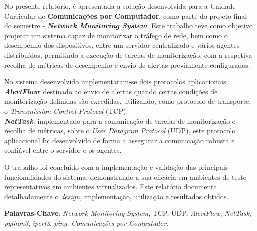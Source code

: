 \documentclass[a4paper,12pt]{scrreprt}
\begin{document}




\makecover





\renewenvironment{abstract}
 {\par\noindent\textbf{\Large\abstractname}\par\bigskip}
 {}

\begin{flushleft}
\begin{abstract}
    \par No presente relatório, é apresentada a solução desenvolvida para a Unidade Curricular
    de \textbf{Comunicações por Computador}, como parte do projeto final do semestre -
    \textbf{\textit{Network Monitoring System}}.
    Este trabalho teve como objetivo projetar um sistema capaz de monitorizar
    o tráfego de rede, bem como o desempenho dos dispositivos, entre um servidor
    centralizado e vários agentes distribuídos, permitindo a execução de tarefas
    de monitorização, com a respetiva recolha de métricas de desempenho e envio
    de alertas previamente configurados.

    No sistema desenvolvido implementaram-se dois protocolos aplicacionais: \\
    \textbf{\textit{AlertFlow}}:
    destinado ao envio de alertas quando certas condições de monitorização
    definidas são excedidas, utilizando, como protocolo de transporte,
    o \textit{Transmission Control Protocol} (TCP). \\
    \textbf{\textit{NetTask}}: implementado para a comunicação de tarefas de monitorização
    e recolha de métricas, sobre o \textit{User Datagram Protocol} (UDP),
    este protocolo aplicacional foi desenvolvido de forma a assegurar
    a comunicação robusta e confiável entre o servidor e os agentes.

    O trabalho foi concluído com a implementação e validação das principais funcionalidades do sistema,
    demonstrando a sua eficácia em ambientes de teste representativos em ambientes virtualizados.
    Este relatório documenta detalhadamente o \textit{design}, implementação, utilização
    e resultados obtidos.

\par \textbf{Palavras-Chave}: \textit{Network Monitoring System}, TCP, UDP,
    \textit{AlertFlow}, \textit{NetTask}, \textit{python3}, \textit{iperf3},
    \textit{ping}, \textit{Comunicações por Computador}.
\end{abstract}
\end{flushleft}
\end{document}
